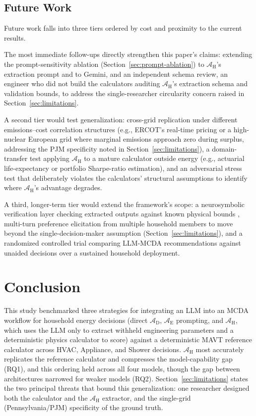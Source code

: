 \documentclass[a4paper,fleqn]{cas-dc}
\begin{document}
\subsection{Future Work}
\label{sec:futurework}
Future work falls into three tiers ordered by cost and proximity to the current results.

The most immediate follow-ups directly strengthen this paper's claims: extending the prompt-sensitivity ablation (Section~\ref{sec:prompt-ablation}) to $\mathcal{A}_{\text{H}}$'s extraction prompt and to Gemini, and an independent schema review, an engineer who did not build the calculators auditing $\mathcal{A}_{\text{H}}$'s extraction schema and validation bounds, to address the single-researcher circularity concern raised in Section~\ref{sec:limitations}.

A second tier would test generalization: cross-grid replication under different emissions--cost correlation structures (e.g., ERCOT's real-time pricing or a high-nuclear European grid where marginal emissions approach zero during surplus, addressing the PJM specificity noted in Section~\ref{sec:limitations}), a domain-transfer test applying $\mathcal{A}_{\text{H}}$ to a mature calculator outside energy (e.g., actuarial life-expectancy or portfolio Sharpe-ratio estimation), and an adversarial stress test that deliberately violates the calculators' structural assumptions to identify where $\mathcal{A}_{\text{H}}$'s advantage degrades.

A third, longer-term tier would extend the framework's scope: a neurosymbolic verification layer checking extracted outputs against known physical bounds \citep{mattas2026neurosymbolic,ye2023satlm}, multi-turn preference elicitation from multiple household members to move beyond the single-decision-maker assumption (Section~\ref{sec:limitations}), and a randomized controlled trial comparing LLM-MCDA recommendations against unaided decisions over a sustained household deployment.

\FloatBarrier
\section{Conclusion}
\label{sec:conclusion}
This study benchmarked three strategies for integrating an LLM into an MCDA workflow for household energy decisions (direct $\mathcal{A}_{\text{D}}$, $\mathcal{A}_{\text{E}}$ prompting, and $\mathcal{A}_{\text{H}}$, which uses the LLM only to extract withheld engineering parameters and a deterministic physics calculator to score) against a deterministic MAVT reference calculator across HVAC, Appliance, and Shower decisions. $\mathcal{A}_{\text{H}}$ most accurately replicates the reference calculator and compresses the model-capability gap (RQ1), and this ordering held across all four models, though the gap between architectures narrowed for weaker models (RQ2). Section~\ref{sec:limitations} states the two principal threats that bound this generalization: one researcher designed both the calculator and the $\mathcal{A}_{\text{H}}$ extractor, and the single-grid (Pennsylvania/PJM) specificity of the ground truth.
\end{document}
